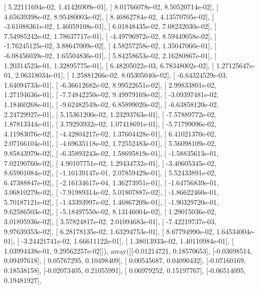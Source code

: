 \documentclass{article}
\begin{document}
       [  5.22111694e-02,   1.41426909e-01],
       [  8.01766078e-02,   8.50520714e-02],
       [  4.65639398e-02,   8.95480003e-02],
       [  8.46862784e-02,   4.13570705e-02],
       [ -3.61088361e-02,   1.46059108e-01],
       [  6.01848435e-02,   7.08232030e-02],
       [  7.54985242e-02,   1.78637717e-01],
       [ -4.49796972e-02,   8.59449058e-02],
       [ -1.76245125e-02,   3.88647009e-02],
       [  4.58257258e-02,   1.35047060e-01],
       [ -6.08456039e-02,   1.65504836e-01],
       [  5.84258653e-02,   2.16280867e-01],
       [  1.20314523e-01,   1.32895775e-01],
       [  6.48205022e-03,   6.78348002e-02],
       [  1.27125647e-01,   2.06318034e-01],
       [  1.25881266e-02,   8.05305040e-02],
       [ -6.64324529e-03,   1.64094733e-01],
       [ -6.36612682e-02,   8.99522651e-02],
       [  2.99833801e-02,   1.27194636e-01],
       [ -7.74842250e-02,   9.49979169e-02],
       [ -3.09397481e-02,   1.18460268e-01],
       [ -9.62482549e-02,   6.85899020e-02],
       [ -6.63858120e-02,   2.24729927e-01],
       [  5.15361200e-02,   1.23293763e-01],
       [ -7.57889772e-02,   1.87813344e-01],
       [  3.79293932e-02,   1.07418691e-01],
       [ -5.71799096e-02,   4.11983076e-02],
       [ -4.42804217e-02,   1.37604428e-01],
       [  6.41021370e-02,   2.07166104e-01],
       [ -4.69635118e-02,   1.72552483e-01],
       [  5.56098109e-02,   9.85843979e-02],
       [ -6.35893243e-02,   1.58695819e-01],
       [ -1.58835613e-01,   7.02190760e-02],
       [  4.90107751e-02,   1.29434732e-01],
       [ -3.40605345e-02,   8.65901084e-02],
       [ -1.10139147e-01,   2.07859429e-01],
       [  5.52433891e-02,   6.47388847e-02],
       [ -2.16134617e-04,   1.36273951e-01],
       [ -1.64756839e-01,   3.06810279e-02],
       [ -7.91989314e-02,   5.01807887e-02],
       [ -1.86622460e-01,   5.70187121e-02],
       [ -1.43393997e-02,   1.46867209e-01],
       [ -1.90329720e-01,   9.62586503e-02],
       [ -5.18497550e-02,   8.13146004e-02],
       [  1.29015036e-02,   3.01895936e-02],
       [  3.57824817e-02,   2.01094683e-01],
       [ -7.42219737e-03,   9.97639353e-02],
       [  6.28178135e-02,   1.63294753e-01],
       [  8.67794990e-02,   1.64534004e-01],
       [ -3.24421741e-02,   1.66611122e-01],
       [  1.38013933e-02,   1.40110984e-01],
       [  1.03994438e-01,   9.29562257e-02]]), array([[-0.01214721,  0.18570653],
       [-0.03698514,  0.09497618],
       [ 0.05767295,  0.10498409],
       [ 0.00545687,  0.04090432],
       [-0.07160169,  0.18538158],
       [-0.02073405,  0.21055991],
       [ 0.06979252,  0.15197767],
       [-0.06514095,  0.19481927],
\end{document}
